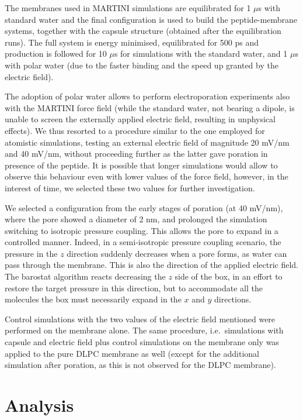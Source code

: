 The membranes used in MARTINI simulations are equilibrated for 1 $\mu$s with standard water and the final configuration is used to build the peptide-membrane systems, together with the capsule structure (obtained after the equilibration runs). The full system is energy minimised, equilibrated for 500 ps and production is followed for 10 $\mu$s for simulations with the standard water, and 1 $\mu$s with polar water (due to the faster binding and the speed up granted by the electric field).

The adoption of polar water allows to perform electroporation experiments also with the MARTINI force field (while the standard water, not bearing a dipole, is unable to screen the externally applied electric field, resulting in unphysical effects).
%
We thus resorted to a procedure similar to the one employed for atomistic simulations, testing an external electric field of magnitude 20 mV/nm and 40 mV/nm, without proceeding further as the latter gave poration in presence of the peptide.
%
It is possible that longer simulations would allow to observe this behaviour even with lower values of the force field, however, in the interest of time, we selected these two values for further investigation.

We selected a configuration from the early stages of poration (at 40 mV/nm), where the pore showed a diameter of 2 nm, and prolonged the simulation switching to isotropic pressure coupling. This allows the pore to expand in a controlled manner. Indeed, in a semi-isotropic pressure coupling scenario, the pressure in the $z$ direction suddenly decreases when a pore forms, as water can pass through the membrane. This is also the direction of the applied electric field. The barostat algorithm reacts decreasing the $z$ side of the box, in an effort to restore the target pressure in this direction, but to accommodate all the molecules the box must necessarily expand in the $x$ and $y$ directions.

Control simulations with the two values of the electric field mentioned were performed on the membrane alone. The same procedure, i.e.\ simulations with capsule and electric field plus control simulations on the membrane only was applied to the pure DLPC membrane as well (except for the additional simulation after poration, as this is not observed for the DLPC membrane).


\section{Analysis} \label{sec:analysis}

